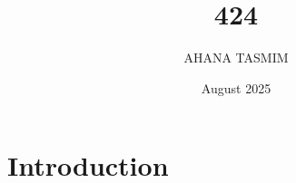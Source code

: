 \documentclass{article}
\title{424}
\author{AHANA TASMIM}
\date{August 2025}
\begin{document}
\maketitle

\section{Introduction}
\end{document}
